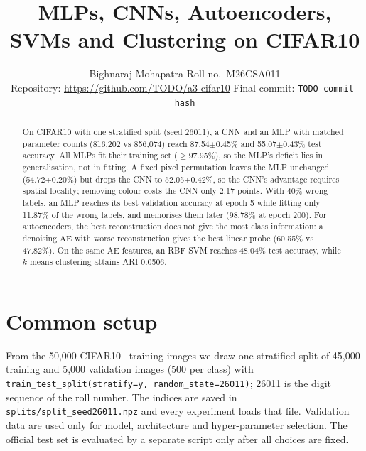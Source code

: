 \documentclass[10pt,twocolumn,letterpaper]{article}
\title{MLPs, CNNs, Autoencoders, SVMs and Clustering on CIFAR10}
\author{Bighnaraj Mohapatra \quad Roll no.\ M26CSA011\\
Repository: \url{https://github.com/TODO/a3-cifar10} \quad Final commit: \texttt{TODO-commit-hash}}
\begin{document}
\maketitle

\begin{abstract}
On CIFAR10 with one stratified split (seed 26011), a CNN and an MLP with matched parameter counts (816,202 vs 856,074) reach 87.54$\pm$0.45\% and 55.07$\pm$0.43\% test accuracy. All MLPs fit their training set ($\geq$97.95\%), so the MLP's deficit lies in generalisation, not in fitting. A fixed pixel permutation leaves the MLP unchanged (54.72$\pm$0.20\%) but drops the CNN to 52.05$\pm$0.42\%, so the CNN's advantage requires spatial locality; removing colour costs the CNN only 2.17 points. With 40\% wrong labels, an MLP reaches its best validation accuracy at epoch 5 while fitting only 11.87\% of the wrong labels, and memorises them later (98.78\% at epoch 200). For autoencoders, the best reconstruction does not give the most class information: a denoising AE with worse reconstruction gives the best linear probe (60.55\% vs 47.82\%). On the same AE features, an RBF SVM reaches 48.04\% test accuracy, while $k$-means clustering attains ARI 0.0506.
\end{abstract}

\section{Common setup}
\label{sec:setup}
From the 50,000 CIFAR10~\cite{krizhevsky2009cifar} training images we draw one stratified split of 45,000 training and 5,000
validation images (500 per class) with \texttt{train\_test\_split(stratify=y, random\_state=26011)};
26011 is the digit sequence of the roll number. The indices are saved in
\texttt{splits/split\_seed26011.npz} and every experiment loads that file. Validation data are used only
for model, architecture and hyper-parameter selection. The official test set is evaluated by a separate
script only after all choices are fixed.
\end{document}
